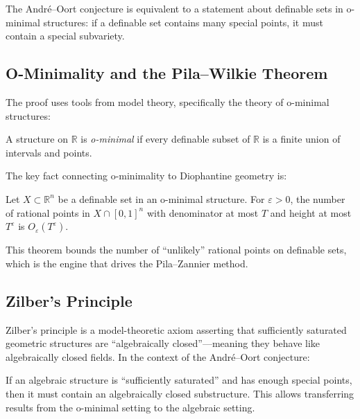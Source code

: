 \begin{fact}
The André--Oort conjecture is equivalent to a statement about definable sets in o-minimal structures: if a definable set contains many special points, it must contain a special subvariety.
\end{fact}

\subsection{O-Minimality and the Pila--Wilkie Theorem}

The proof uses tools from model theory, specifically the theory of o-minimal structures:

\begin{definition}
A structure on $\mathbb{R}$ is \emph{o-minimal} if every definable subset of $\mathbb{R}$ is a finite union of intervals and points.
\end{definition}

The key fact connecting o-minimality to Diophantine geometry is:

\begin{theorem}
Let $X \subset \mathbb{R}^n$ be a definable set in an o-minimal structure. For $\varepsilon > 0$, the number of rational points in $X \cap [0,1]^n$ with denominator at most $T$ and height at most $T^\varepsilon$ is $O_\varepsilon(T^\varepsilon)$.
\end{theorem}

This theorem bounds the number of ``unlikely'' rational points on definable sets, which is the engine that drives the Pila--Zannier method.

\subsection{Zilber's Principle}

Zilber's principle is a model-theoretic axiom asserting that sufficiently saturated geometric structures are ``algebraically closed''---meaning they behave like algebraically closed fields. In the context of the André--Oort conjecture:

\begin{fact}
If an algebraic structure is ``sufficiently saturated'' and has enough special points, then it must contain an algebraically closed substructure. This allows transferring results from the o-minimal setting to the algebraic setting.
\end{fact}

